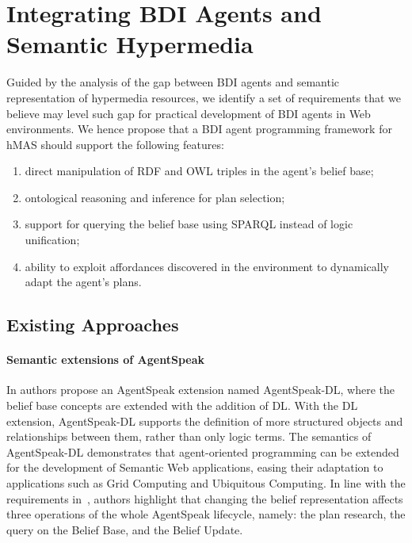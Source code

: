 \documentclass[
]{ceurart}
\begin{document}
\section{Integrating \acs{BDI} Agents and Semantic Hypermedia}
\label{sec:integrating-bdi-hypermedia}


Guided by the analysis of the gap between \ac{BDI} agents and semantic representation of hypermedia resources,
we identify a set of requirements that we believe may level such gap for practical development of \ac{BDI} agents in Web environments.
We hence propose that a \ac{BDI} agent programming framework for \ac{hMAS} should support the following features:
\begin{enumerate}[label={(R\arabic*)}]
  \item direct manipulation of \ac{RDF} and \ac{OWL} triples in the agent's belief base;
  \item ontological reasoning and inference for plan selection;
  \item support for querying the belief base using \ac{SPARQL} instead of logic unification;
  \item ability to exploit affordances discovered in the environment to dynamically adapt the agent's plans.
\end{enumerate}

\subsection{Existing Approaches}

\paragraph{Semantic extensions of AgentSpeak}
In \cite{DBLP:conf/dalt/MoreiraVBH05} authors propose an AgentSpeak extension named AgentSpeak-DL, 
where the belief base concepts are extended with the addition of \ac{DL}.
%
With the \ac{DL} extension, 
AgentSpeak-DL supports the definition of more structured objects and relationships between them, 
rather than only logic terms.
%
The semantics of AgentSpeak-DL demonstrates that agent-oriented programming can be extended for the development of Semantic Web applications, 
easing their adaptation to applications such as Grid Computing and Ubiquitous Computing.
%
In line with the requirements in~, 
authors highlight that changing the belief representation affects three operations of the whole AgentSpeak lifecycle, namely: the plan research, the query on the Belief Base, and the Belief Update.
\end{document}
